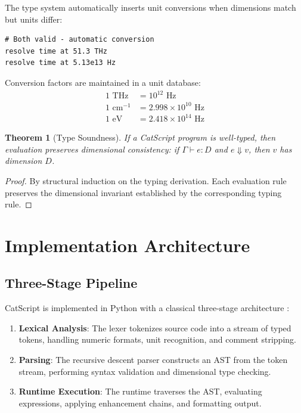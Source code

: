 \documentclass[twocolumn,10pt]{article}
\newtheorem{theorem}{Theorem}[section]
\begin{document}
The type system automatically inserts unit conversions when dimensions match but units differ:

\begin{lstlisting}
# Both valid - automatic conversion
resolve time at 51.3 THz
resolve time at 5.13e13 Hz
\end{lstlisting}

Conversion factors are maintained in a unit database:
\begin{align}
    1 \text{ THz} &= 10^{12} \text{ Hz} \\
    1 \text{ cm}^{-1} &= 2.998 \times 10^{10} \text{ Hz} \\
    1 \text{ eV} &= 2.418 \times 10^{14} \text{ Hz}
\end{align}

\begin{theorem}[Type Soundness]
If a CatScript program is well-typed, then evaluation preserves dimensional consistency: if $\Gamma \vdash e : D$ and $e \Downarrow v$, then $v$ has dimension $D$.
\end{theorem}

\begin{proof}
By structural induction on the typing derivation. Each evaluation rule preserves the dimensional invariant established by the corresponding typing rule.
\end{proof}

\section{Implementation Architecture}
\label{sec:implementation}

\subsection{Three-Stage Pipeline}

CatScript is implemented in Python with a classical three-stage architecture \cite{aho2006compilers}:

\begin{enumerate}
    \item \textbf{Lexical Analysis}: The lexer tokenizes source code into a stream of typed tokens, handling numeric formats, unit recognition, and comment stripping.

    \item \textbf{Parsing}: The recursive descent parser constructs an AST from the token stream, performing syntax validation and dimensional type checking.

    \item \textbf{Runtime Execution}: The runtime traverses the AST, evaluating expressions, applying enhancement chains, and formatting output.
\end{enumerate}
\end{document}
